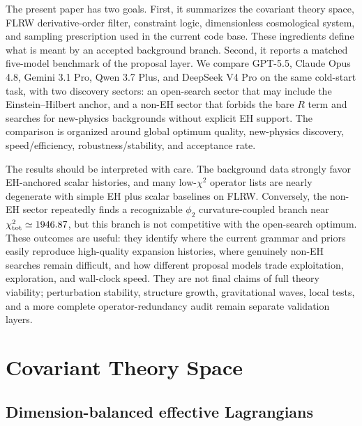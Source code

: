 \documentclass[aps,prd,twocolumn,superscriptaddress,nofootinbib,longbibliography]{revtex4-2}
\begin{document}
The present paper has two goals.  First, it summarizes the covariant theory space, FLRW derivative-order filter, constraint logic, dimensionless cosmological system, and sampling prescription used in the current code base.  These ingredients define what is meant by an accepted background branch.  Second, it reports a matched five-model benchmark of the proposal layer.  We compare GPT-5.5, Claude Opus 4.8, Gemini 3.1 Pro, Qwen 3.7 Plus, and DeepSeek V4 Pro on the same cold-start task, with two discovery sectors: an open-search sector that may include the Einstein--Hilbert anchor, and a non-EH sector that forbids the bare $R$ term and searches for new-physics backgrounds without explicit EH support.  The comparison is organized around global optimum quality, new-physics discovery, speed/efficiency, robustness/stability, and acceptance rate.

The results should be interpreted with care.  The background data strongly favor EH-anchored scalar histories, and many low-$\chi^2$ operator lists are nearly degenerate with simple EH plus scalar baselines on FLRW.  Conversely, the non-EH sector repeatedly finds a recognizable $\phi_2$ curvature-coupled branch near $\chi^2_{\rm tot}\simeq 1946.87$, but this branch is not competitive with the open-search optimum.  These outcomes are useful: they identify where the current grammar and priors easily reproduce high-quality expansion histories, where genuinely non-EH searches remain difficult, and how different proposal models trade exploitation, exploration, and wall-clock speed.  They are not final claims of full theory viability; perturbation stability, structure growth, gravitational waves, local tests, and a more complete operator-redundancy audit remain separate validation layers.

\section{Covariant Theory Space}
\label{sec:theory-space}

\subsection{Dimension-balanced effective Lagrangians}
\label{subsec:dimension-balanced}
\end{document}
